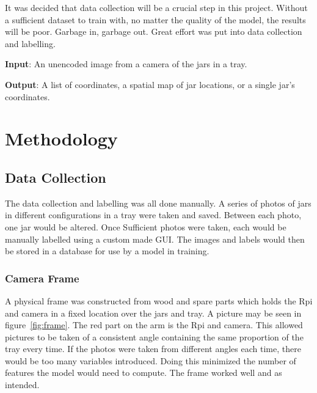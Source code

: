 \documentclass[11pt]{article}
\begin{document}
            It was decided that data collection will be a crucial step in this project. Without a sufficient dataset to train with, no matter the quality of the model, the results will be poor. Garbage in, garbage out. Great effort was put into data collection and labelling.

            \textbf{Input}: An unencoded image from a camera of the jars in a tray.

            \textbf{Output}: A list of coordinates, a spatial map of jar locations, or a single jar's coordinates. %

    \FloatBarrier
    \section{Methodology}
        \subsection{Data Collection}
            The data collection and labelling was all done manually. A series of photos of jars in different configurations in a tray were taken and saved. Between each photo, one jar would be altered. Once Sufficient photos were taken, each would be manually labelled using a custom made GUI. The images and labels would then be stored in a database for use by a model in training.

            \subsubsection{Camera Frame}
                A physical frame was constructed from wood and spare parts which holds the Rpi and camera in a fixed location over the jars and tray. A picture may be seen in figure~\ref{fig:frame}. The red part on the arm is the Rpi and camera. This allowed pictures to be taken of a consistent angle containing the same proportion of the tray every time. If the photos were taken from different angles each time, there would be too many variables introduced. Doing this minimized the number of features the model would need to compute. The frame worked well and as intended.
\end{document}
